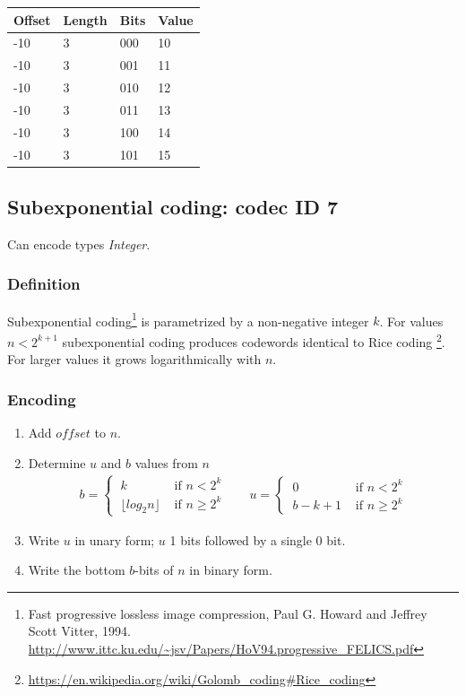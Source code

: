 \documentclass[a4paper]{article}
\begin{document}
\begin{tabular}{|>{\raggedright}p{105pt}|>{\raggedright}p{105pt}|>{\raggedright}p{105pt}|>{\raggedright}p{105pt}|}
\hline
Offset & Length & \textbf{Bits} & \textbf{Value}\tabularnewline
\hline
-10 & 3 & 000 & 10\tabularnewline
\hline
-10 & 3 & 001 & 11\tabularnewline
\hline
-10 & 3 & 010 & 12\tabularnewline
\hline
-10 & 3 & 011 & 13\tabularnewline
\hline
-10 & 3 & 100 & 14\tabularnewline
\hline
-10 & 3 & 101 & 15\tabularnewline
\hline
\end{tabular}

\subsection{Subexponential coding: codec ID 7}

Can encode types \textit{Integer}.

\subsubsection*{Definition}

Subexponential coding\footnote{Fast progressive lossless image compression, Paul G. Howard and Jeffrey Scott Vitter, 1994. \url{http://www.ittc.ku.edu/~jsv/Papers/HoV94.progressive_FELICS.pdf}} is parametrized by a non-negative integer $k$.
For values $n < 2^{k+1}$ subexponential coding produces codewords identical to Rice coding \footnote{\url{https://en.wikipedia.org/wiki/Golomb_coding\#Rice_coding}}.  For larger values it grows logarithmically with $n$.

\subsubsection*{Encoding}

\begin{enumerate}
\item Add $\mathit{offset}$ to $n$.

\item Determine $u$ and $b$ values from $n$
\begin{align*}
b =
\begin{cases}
  \ k                        & \text{ if $n < 2^k$} \\
  \ \lfloor log_{2}n \rfloor & \text{ if $n \ge 2^k$}
\end{cases}
&\
&u =
\begin{cases}
  \ 0     & \text{ if $n < 2^k$} \\
  \ b-k+1 & \text{ if $n \ge 2^k$}
\end{cases}
\end{align*}

\item Write $u$ in unary form; $u$ 1 bits followed by a single 0 bit.

\item Write the bottom $b$-bits of $n$ in binary form.
\end{enumerate}
\end{document}
